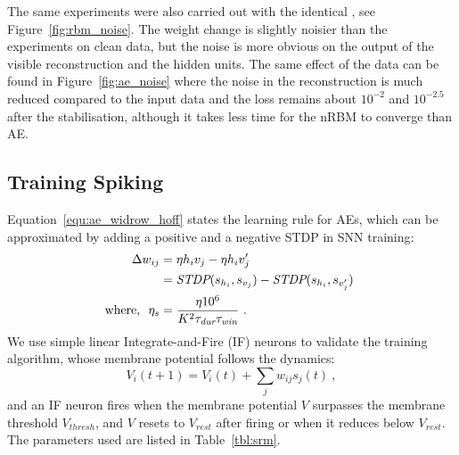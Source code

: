 The same experiments were also carried out with the identical \DIFdelbegin {}\DIFdelend \DIFaddbegin {}\DIFaddend , see Figure~\ref{fig:rbm_noise}.
The weight change is slightly noisier than the experiments on clean data, but the noise is more obvious on the output of the visible reconstruction and the hidden units.
The same effect of the \DIFdelbegin {}\DIFdelend \DIFaddbegin {}\DIFaddend data can be found in Figure~\ref{fig:ae_noise} where the noise in the reconstruction is much reduced compared to the input data and the loss remains about $10^{-2}$ and $10^{-2.5}$ after the stabilisation, although it takes less time for the nRBM to converge than AE.


\DIFdelbegin %
\DIFdelend \DIFaddbegin \subsection[Spiking AEs]{\DIFaddend Training Spiking \DIFdelbegin {}\DIFdelend \DIFaddbegin {}\DIFaddend }
\label{subsec:exp_SAE}
Equation~\ref{equ:ae_widrow_hoff} states the learning rule for AEs, which can be approximated by adding a positive \DIFdelbegin {}\DIFdelend and a negative STDP in SNN training:
\begin{equation}
\label{equ:sae}
\begin{aligned}
	\Delta w_{ij} &= \eta h_i v_j - \eta h_i v'_j \\
	&= \textit{\textrm{STDP}}(s_{h_i}, s_{v_j}) - \textit{\textrm{STDP}}(s_{h_i}, s_{v'_j})~ \\
	\textrm{where,~~} \eta_{s} &=  \frac{\eta 10^6}{K^2 \tau_{\textit{\textrm{dur}}} \tau_{\textit{\textrm{win}}}}~.
\end{aligned} 
\end{equation}
We use simple linear Integrate-and-Fire (IF) neurons to validate the training algorithm, whose membrane potential follows the dynamics:
\begin{equation}
V_i(t+1)=V_i(t) + \sum_j w_{ij} s_j(t)~,
\end{equation}
and an IF neuron fires when the membrane potential $V$ surpasses the membrane threshold $V_{thresh}$, and $V$ resets to $V_{rest}$ after firing or when it reduces below $V_{rest}$.
The parameters used are listed in Table~\ref{tbl:srm}.

